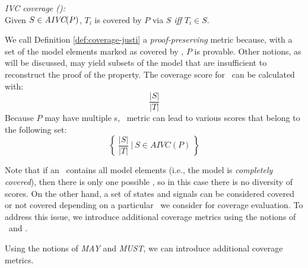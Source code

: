 
\begin{definition} {\emph{IVC coverage (\ivccov):}} \\
\label{def:coverage-justi}
Given $S \in \textit{AIVC}(P)$, $T_i$ is covered by $P$ via $S$ \emph{iff} $T_i \in S$.
\end{definition}

We call Definition \ref{def:coverage-justi} a \emph{proof-preserving} metric because, with a set of the model elements marked as covered by \ivccov ,
$P$ is provable.  Other notions, as will be discussed,
may yield subsets of the model that are insufficient to
reconstruct the proof of the property.
The coverage score for \ivccov\ can be calculated with: $$\frac{|S|}{|T|}$$
Because $P$ may have multiple \mivc s,
  \ivccov\ metric can lead to various scores that belong to the following set:
\[
\left\{~\frac{ |S|}{|T|}~\bigg|~S \in AIVC(P)~\right\}
\]

\noindent Note that if an \mivc ~contains all model elements (i.e., the model is {\em completely covered}), then there is only one possible \mivc , so in this case there is no diversity of scores. On the other hand, a set of states and signals can be considered covered or not covered depending on a particular \mivc\ we consider for coverage evaluation. To address this issue, we introduce additional coverage metrics using the notions of \may\ and \must.


Using the notions of \textit{MAY} and \textit{MUST}, we can introduce additional coverage metrics.

